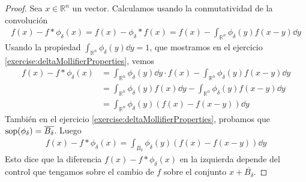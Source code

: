 \documentclass{article}
\newcommand{\realNumbers}{\mathbb{R}}
\DeclareMathOperator{\support}{\textnormal{sop}}
\theoremstyle{remark}
\begin{document}
\begin{proof}
  Sea \(x \in \realNumbers^n\) un vector.
  Calculamos usando la conmutatividad de la convolución
  \begin{align}
    f(x) - f * \phi_{\delta} (x)
    =
    f(x) - \phi_{\delta} * f (x)
    =
    f(x) - \int_{\realNumbers^n} \phi_{\delta}(y) f(x - y) \dd y
  \end{align}
  Usando la propiedad \(\int_{\realNumbers^n} \phi_{\delta}(y) \dd y = 1\), que mostramos en el ejercicio \ref{exercise:deltaMollifierProperties}, vemos
  \begin{align}
    f(x) - f * \phi_{\delta}(x)
    &=
    \int_{\realNumbers^n} \phi_{\delta}(y) \dd y \cdot f(x) - \int_{\realNumbers^n} \phi_{\delta}(y) f(x - y) \dd y
    \\
    &=
    \int_{\realNumbers^n} \phi_{\delta}(y) f(x) \dd y - \int_{\realNumbers^n} \phi_{\delta}(y) f(x - y) \dd y
    \\
    &=
    \int_{\realNumbers^n} \phi_{\delta}(y) (f(x) - f(x - y)) \dd y
  \end{align}
  También en el ejercicio \ref{exercise:deltaMollifierProperties}, probamos que \(\support(\phi_{\delta}) = \overline{B_{\delta}}\).
  Luego
  \begin{align}
    f(x) - f * \phi_{\delta}(x)
    =
    \int_{\overline{B_{\delta}}} \phi_{\delta}(y) (f(x) - f(x - y)) \dd y
  \end{align}
  Esto dice que la diferencia \(f(x) - f * \phi_{\delta}(x)\) en la izquierda depende del control que tengamos sobre el cambio de \(f\) sobre el conjunto \(x + \overline{B_{\delta}}\).


\end{proof}
\end{document}
